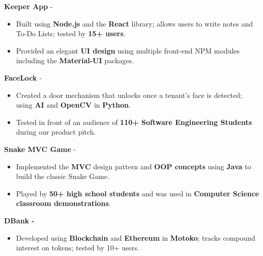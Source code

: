 \documentclass[letterpaper,10.8pt]{article}
\newcommand{\myhyrest}[2]{\href{#1}{\color{blue}{#2}}}
\begin{document}
    \vspace{1mm}
    \large{\textbf{Keeper App} - \myhyrest{https://github.com/Hamza-Mos/KeeperApp}{Link}}
    
    \normalsize{\begin{itemize} [noitemsep,nolistsep]
        \item Built using \textbf{Node.js} and the \textbf{React} library; allows users to write notes and To-Do Lists; tested by \textbf{15+ users}.
        \item Provided an elegant \textbf{UI design} using multiple front-end NPM modules including the \textbf{Material-UI} packages.
    \end{itemize}}
    
    \vspace{1mm}
    \large{\textbf{FaceLock} - \myhyrest{https://github.com/Hamza-Mos/FaceLock}{Link}}
    
    \normalsize{\begin{itemize} [noitemsep,nolistsep]
        \item Created a door mechanism that unlocks once a tenant's face is detected; using \textbf{AI} and \textbf{OpenCV} in \textbf{Python}.
        \item Tested in front of an audience of \textbf{110+ Software Engineering Students} during our product pitch.
    \end{itemize}}
    
    \vspace{1mm}
    \large{\textbf{Snake MVC Game} - \myhyrest{https://github.com/Hamza-Mos/Snake-MVC-Game}{Link}}
    
    \normalsize{\begin{itemize} [noitemsep,nolistsep]
        \item Implemented the \textbf{MVC} design pattern and \textbf{OOP concepts} using \textbf{Java} to build the classic Snake Game.
        \item Played by \textbf{50+ high school students} and was used in \textbf{Computer Science classroom demonstrations}.
    \end{itemize}}
    
    \vspace{1mm}
    \textbf{\large{DBank -}} \large{\myhyrest{https://github.com/Hamza-Mos/DBank}{Link}}
    
    \normalsize{\begin{itemize} [noitemsep,nolistsep]
        \item Developed using \textbf{Blockchain} and \textbf{Ethereum} in \textbf{Motoko}; tracks compound interest on tokens; tested by 10+ users.
    \end{itemize}}
\end{document}
